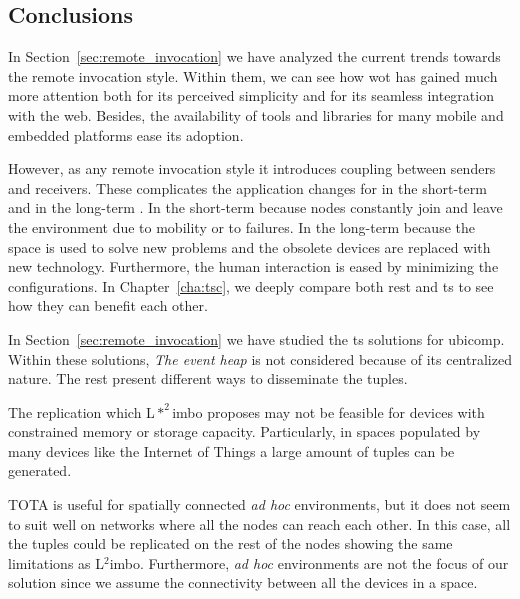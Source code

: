 \subsection{Conclusions} %


In Section~\ref{sec:remote_invocation} we have analyzed the current trends towards the remote invocation style.
Within them, we can see how \ac{wot} has gained much more attention both for its perceived simplicity and for its seamless integration with the web.
Besides, the availability of tools and libraries for many mobile and embedded platforms ease its adoption.

However, as any remote invocation style it introduces coupling between senders and receivers.
These complicates the application changes for in the short-term and in the long-term \citep{johanson_extending_2004}.
In the short-term because nodes constantly join and leave the environment due to mobility or to failures.
In the long-term because the space is used to solve new problems and the obsolete devices are replaced with new technology.
Furthermore, the human interaction is eased by minimizing the configurations.
In Chapter~\ref{cha:tsc}, we deeply compare both \ac{rest} and \ac{ts} to see how they can benefit each other.

\bigskip



In Section~\ref{sec:remote_invocation} we have studied the \ac{ts} solutions for \acl{ubicomp}.
Within these solutions, \emph{The event heap} is not considered because of its centralized nature.
The rest present different ways to disseminate the tuples. %

The replication which L$*^2$imbo proposes may not be feasible for devices with constrained memory or storage capacity.
Particularly, in spaces populated by many devices like the Internet of Things a large amount of tuples can be generated.

TOTA is useful for spatially connected \emph{ad hoc} environments, but it does not seem to suit well on networks where all the nodes can reach each other.
In this case, all the tuples could be replicated on the rest of the nodes showing the same limitations as L$^2$imbo.%
Furthermore, \emph{ad hoc} environments are not the focus of our solution since we assume the connectivity between all the devices in a space.

